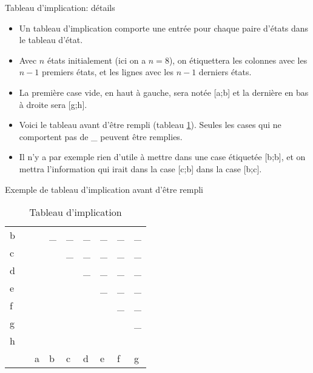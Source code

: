 \documentclass[presentation]{beamer}
\begin{document}
\begin{frame}[label={sec:orge699365}]{Tableau d'implication: détails}
\begin{itemize}
\item Un tableau d'implication comporte une entrée pour chaque paire d'états dans le tableau d'état.

\item Avec \(n\) états initialement (ici on a \(n=8\)), on étiquettera les colonnes avec les \(n-1\) premiers états, et les lignes avec les \(n-1\) derniers états.

\item La première case vide, en haut à gauche, sera notée [a;b] et la dernière en bas à droite sera [g;h].

\item Voici le tableau avant d'être rempli (tableau \ref{tab:orga302d19}).  Seules les cases qui ne comportent pas de \_ peuvent être remplies.

\item Il n'y a par exemple rien d'utile à mettre dans une case étiquetée [b;b], et on mettra l'information qui irait dans la case [c;b] dans la case [b;c].
\end{itemize}
\end{frame}

\begin{frame}[label={sec:org86a09b8}]{Exemple de tableau d'implication avant d'être rempli}
\begin{table}[htbp]
\caption{\label{tab:orga302d19}Tableau d'implication}
\centering
\begin{tabular}{lllllllll}
b &  &  & \_ & \_ & \_ & \_ & \_ & \_\\[0pt]
c &  &  &  & \_ & \_ & \_ & \_ & \_\\[0pt]
d &  &  &  &  & \_ & \_ & \_ & \_\\[0pt]
e &  &  &  &  &  & \_ & \_ & \_\\[0pt]
f &  &  &  &  &  &  & \_ & \_\\[0pt]
g &  &  &  &  &  &  &  & \_\\[0pt]
h &  &  &  &  &  &  &  & \\[0pt]
\hline
 &  & a & b & c & d & e & f & g\\[0pt]
\end{tabular}
\end{table}
\end{frame}
\end{document}
